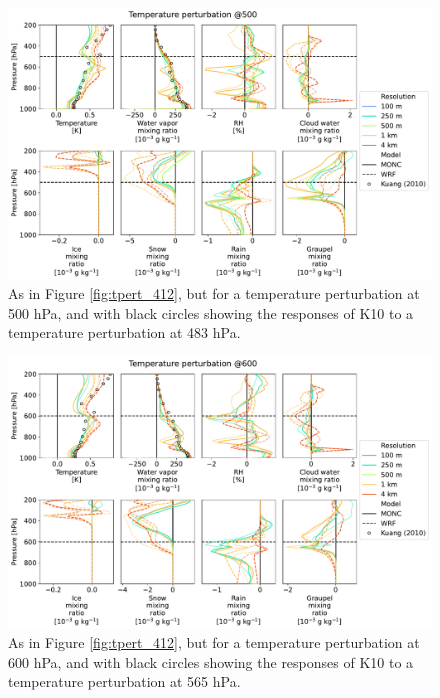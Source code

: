 \documentclass[draft]{agujournal2019}
\begin{document}
\begin{figure}[pth]
    \noindent\includegraphics[width=\textwidth]{figures/pert_diffs_T_0.5_@500}
    \caption{As in Figure \ref{fig:tpert_412}, but for a temperature
    perturbation at 500 hPa, and with black circles showing the responses of K10
    to a temperature perturbation at 483 hPa.}
    \label{fig:tpert_500}
\end{figure}

\begin{figure}[pth]
    \noindent\includegraphics[width=\textwidth]{figures/pert_diffs_T_0.5_@600}
    \caption{As in Figure \ref{fig:tpert_412}, but for a temperature
    perturbation at 600 hPa, and with black circles showing the responses of K10
    to a temperature perturbation at 565 hPa.}
    \label{fig:tpert_600}
\end{figure}
\end{document}
